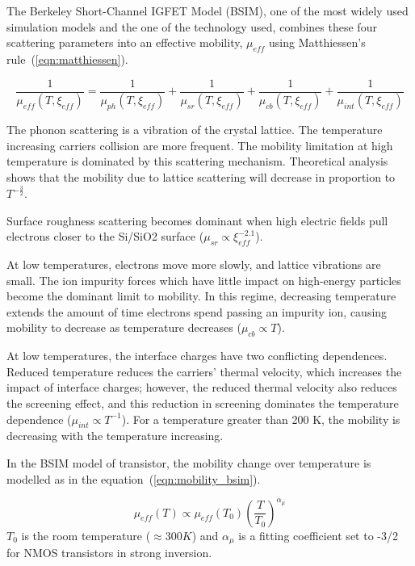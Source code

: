 The Berkeley Short-Channel IGFET Model (BSIM), one of the most widely used simulation models and the one of the technology used, combines these four scattering parameters into an effective mobility, \( \mu_{eff} \) using Matthiessen’s rule~(\ref{eqn:matthiessen}).

\begin{equation}
\label{eqn:matthiessen}
\frac{1}{\mu_{eff}(T, \xi_{eff})} = \frac{1}{\mu_{ph}(T, \xi_{eff})} +
\frac{1}{\mu_{sr}(T, \xi_{eff})} + \frac{1}{\mu_{cb}(T, \xi_{eff})} + 
\frac{1}{\mu_{int}(T, \xi_{eff})}
\end{equation}

The phonon scattering is a vibration of the crystal lattice. The temperature increasing carriers collision are more frequent. The mobility limitation at high temperature is dominated by this scattering mechanism. Theoretical analysis shows that the mobility due to lattice scattering will decrease in proportion to \(T^{-\frac{3}{2}} \).

Surface roughness scattering becomes dominant when high electric fields pull electrons closer to the Si/SiO2 surface (\(\mu_{sr} \varpropto \xi_{eff}^{-2.1} \))\cite{KLee1991}.

At low temperatures, electrons move more slowly, and lattice vibrations are
small. The ion impurity forces which have little impact on high-energy
particles become the dominant limit to mobility. In this regime, decreasing temperature extends the amount of time electrons spend passing an impurity ion, causing mobility to decrease as temperature decreases (\(\mu_{cb} \varpropto T \)).

At low temperatures, the interface charges have two conflicting dependences. Reduced temperature reduces the carriers’ thermal velocity, which increases the impact of interface charges; however, the reduced thermal velocity also reduces the screening effect\cite{Jeon1989}, and this reduction in screening dominates the temperature dependence (\(\mu_{int} \varpropto T^{-1} \)). For a temperature greater than 200 K, the mobility is decreasing with the temperature increasing.

In the BSIM model of transistor, the mobility change over temperature is modelled as in the equation~(\ref{eqn:mobility_bsim}).

\begin{equation}
\label{eqn:mobility_bsim}
\mu_{eff}(T) \varpropto \mu_{eff}(T_0) {\left(\frac{T}{T_0} \right)}^{\alpha_\mu}
\end{equation}
\(T_0 \) is the room temperature (\(\approx 300 K \)) and \(\alpha_\mu \) is a fitting coefficient set to -3/2 for NMOS transistors in strong inversion.

